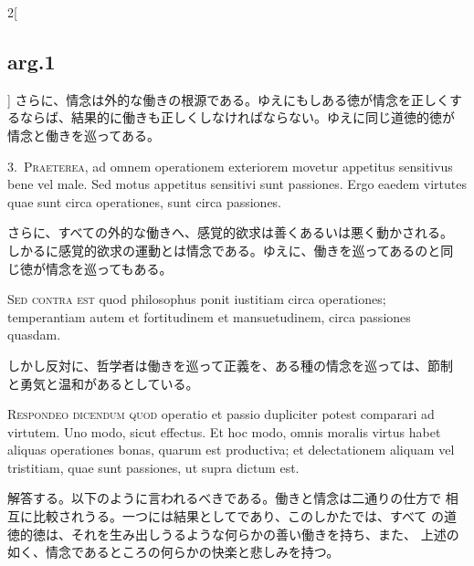 \documentclass[paper=a4paper,fontsize=10pt,jafontsize=9pt,titlepage]{jlreq}
\begin{document}
\begin{paracol}{2}[\subsection{arg.1}]
さらに、情念は外的な働きの根源である。ゆえにもしある徳が情念を正しくす
るならば、結果的に働きも正しくしなければならない。ゆえに同じ道徳的徳が
情念と働きを巡ってある。


3.~{\scshape Praeterea}, ad omnem operationem exteriorem movetur
 appetitus sensitivus bene vel male. Sed motus appetitus sensitivi
 sunt passiones. Ergo eaedem virtutes quae sunt circa operationes,
 sunt circa passiones.

\switchcolumn

さらに、すべての外的な働きへ、感覚的欲求は善くあるいは悪く動かされる。
しかるに感覚的欲求の運動とは情念である。ゆえに、働きを巡ってあるのと同
じ徳が情念を巡ってもある。

\switchcolumn*[\subsection{s.c.}]

{\scshape Sed contra est} quod philosophus ponit iustitiam circa
 operationes; temperantiam autem et fortitudinem et mansuetudinem,
 circa passiones quasdam.

\switchcolumn

しかし反対に、哲学者は働きを巡って正義を、ある種の情念を巡っては、節制
と勇気と温和があるとしている。


{\scshape Respondeo dicendum quod} operatio et passio dupliciter
 potest comparari ad virtutem. Uno modo, sicut effectus. Et hoc modo,
 omnis moralis virtus habet aliquas operationes bonas, quarum est
 productiva; et delectationem aliquam vel tristitiam, quae sunt
 passiones, ut supra dictum est.

\switchcolumn

解答する。以下のように言われるべきである。働きと情念は二通りの仕方で
 相互に比較されうる。一つには結果としてであり、このしかたでは、すべて
 の道徳的徳は、それを生み出しうるような何らかの善い働きを持ち、また、
 上述の如く、情念であるところの何らかの快楽と悲しみを持つ。

\switchcolumn*


\end{paracol}
\end{document}
